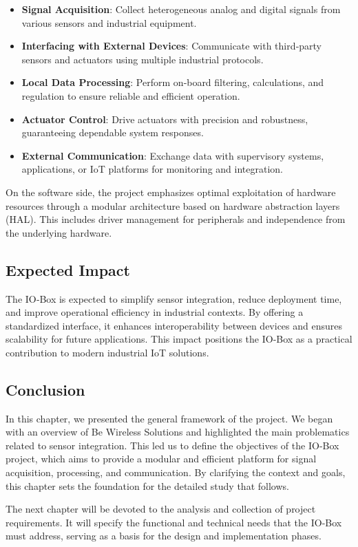 \begin{itemize}
    \item \textbf{Signal Acquisition}: Collect heterogeneous analog and digital signals
    from various sensors and industrial equipment.
    
    \item \textbf{Interfacing with External Devices}: Communicate with third‑party sensors
    and actuators using multiple industrial protocols.
    
    \item \textbf{Local Data Processing}: Perform on‑board filtering, calculations, and
    regulation to ensure reliable and efficient operation.
    
    \item \textbf{Actuator Control}: Drive actuators with precision and robustness,
    guaranteeing dependable system responses.
    
    \item \textbf{External Communication}: Exchange data with supervisory systems,
    applications, or IoT platforms for monitoring and integration.
\end{itemize}

On the software side, the project emphasizes optimal exploitation of hardware resources
through a modular architecture based on hardware abstraction layers (HAL). This includes
driver management for peripherals and independence from the underlying hardware.

\subsection{Expected Impact}

The IO‑Box is expected to simplify sensor integration, reduce deployment time, and
improve operational efficiency in industrial contexts. By offering a standardized
interface, it enhances interoperability between devices and ensures scalability for future
applications. This impact positions the IO‑Box as a practical contribution to modern
industrial IoT solutions.

\subsection{Conclusion}

In this chapter, we presented the general framework of the project. We began with an
overview of Be Wireless Solutions and highlighted the main problematics related to sensor
integration. This led us to define the objectives of the IO‑Box project, which aims to
provide a modular and efficient platform for signal acquisition, processing, and
communication. By clarifying the context and goals, this chapter sets the foundation for
the detailed study that follows.

The next chapter will be devoted to the analysis and collection of project requirements.
It will specify the functional and technical needs that the IO‑Box must address, serving as
a basis for the design and implementation phases.
